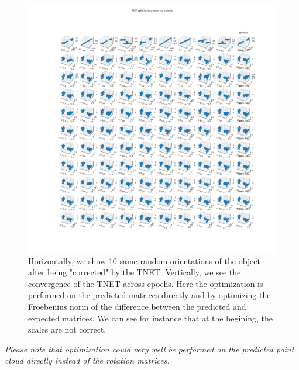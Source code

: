 \documentclass[a4paper]{article}
\begin{document}
\begin{figure}[H]
    \centering
    \includegraphics[width=1.\textwidth]{figures/TNET_optimization.png}
    \caption{Horizontally, we show 10 same random orientations of the object after being "corrected" by the TNET.
    Vertically, we see the convergence of the TNET across epochs. Here the optimization is performed on the predicted matrices directly and by optimizing the Froebenius norm of the difference between the predicted and expected matrices. We can see for instance that at the begining, the scales are not correct.
    }
    \label{fig:validation_convergence_Tnet}
\end{figure}

\textit{Please note that optimization could very well be performed on the predicted point cloud directly instead of the rotation matrices.}
\end{document}
